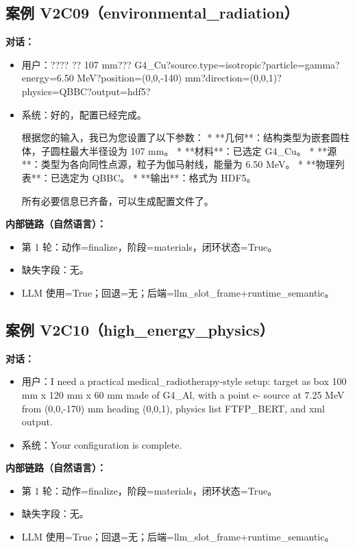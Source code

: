 \documentclass[11pt]{ctexart}
\begin{document}
\subsection{案例 V2C09（environmental\_radiation）}
\textbf{对话：}
\begin{itemize}
\item 用户：???? ?? 107 mm??? G4\_Cu?source.type=isotropic?particle=gamma?energy=6.50 MeV?position=(0,0,-140) mm?direction=(0,0,1)?physics=QBBC?output=hdf5?
\item 系统：好的，配置已经完成。

根据您的输入，我已为您设置了以下参数：
*   **几何**：结构类型为嵌套圆柱体，子圆柱最大半径设为 107 mm。
*   **材料**：已选定 G4\_Cu。
*   **源**：类型为各向同性点源，粒子为伽马射线，能量为 6.50 MeV。
*   **物理列表**：已选定为 QBBC。
*   **输出**：格式为 HDF5。

所有必要信息已齐备，可以生成配置文件了。
\end{itemize}
\textbf{内部链路（自然语言）：}
\begin{itemize}
\item 第 1 轮：动作=finalize，阶段=materials，闭环状态=True。
\item 缺失字段：无。
\item LLM 使用=True；回退=无；后端=llm\_slot\_frame+runtime\_semantic。
\end{itemize}
\subsection{案例 V2C10（high\_energy\_physics）}
\textbf{对话：}
\begin{itemize}
\item 用户：I need a practical medical\_radiotherapy-style setup: target as box 100 mm x 120 mm x 60 mm made of G4\_Al, with a point e- source at 7.25 MeV from (0,0,-170) mm heading (0,0,1), physics list FTFP\_BERT, and xml output.
\item 系统：Your configuration is complete.
\end{itemize}
\textbf{内部链路（自然语言）：}
\begin{itemize}
\item 第 1 轮：动作=finalize，阶段=materials，闭环状态=True。
\item 缺失字段：无。
\item LLM 使用=True；回退=无；后端=llm\_slot\_frame+runtime\_semantic。
\end{itemize}
\end{document}
